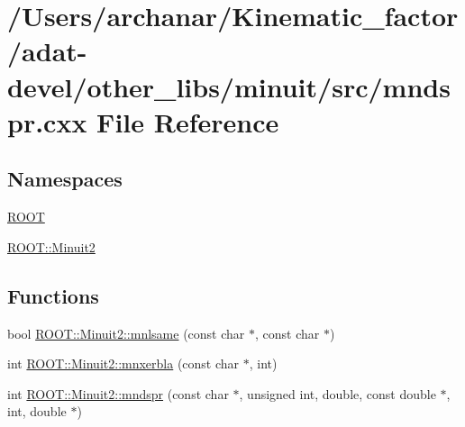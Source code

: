 \hypertarget{adat-devel_2other__libs_2minuit_2src_2mndspr_8cxx}{}\section{/\+Users/archanar/\+Kinematic\+\_\+factor/adat-\/devel/other\+\_\+libs/minuit/src/mndspr.cxx File Reference}
\label{adat-devel_2other__libs_2minuit_2src_2mndspr_8cxx}
\subsection*{Namespaces}
\begin{DoxyCompactItemize}
\item 
 \mbox{\hyperlink{namespaceROOT}{R\+O\+OT}}
\item 
 \mbox{\hyperlink{namespaceROOT_1_1Minuit2}{R\+O\+O\+T\+::\+Minuit2}}
\end{DoxyCompactItemize}
\subsection*{Functions}
\begin{DoxyCompactItemize}
\item 
bool \mbox{\hyperlink{namespaceROOT_1_1Minuit2_a3f90b826c2c1b4313f9a90c22b8ee657}{R\+O\+O\+T\+::\+Minuit2\+::mnlsame}} (const char $\ast$, const char $\ast$)
\item 
int \mbox{\hyperlink{namespaceROOT_1_1Minuit2_a6c2d97c42f0b3f75b7370ae5e6f2c638}{R\+O\+O\+T\+::\+Minuit2\+::mnxerbla}} (const char $\ast$, int)
\item 
int \mbox{\hyperlink{namespaceROOT_1_1Minuit2_acc89c3c759da8dc191d0a862e354a555}{R\+O\+O\+T\+::\+Minuit2\+::mndspr}} (const char $\ast$, unsigned int, double, const double $\ast$, int, double $\ast$)
\end{DoxyCompactItemize}
